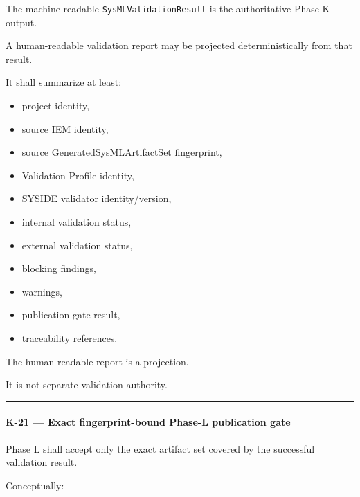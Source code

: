 The machine-readable \texttt{SysMLValidationResult} is the authoritative Phase-K output.

A human-readable validation report may be projected deterministically from that result.

It shall summarize at least:

\begin{itemize}
\tightlist
\item
  project identity,
\item
  source IEM identity,
\item
  source GeneratedSysMLArtifactSet fingerprint,
\item
  Validation Profile identity,
\item
  SYSIDE validator identity/version,
\item
  internal validation status,
\item
  external validation status,
\item
  blocking findings,
\item
  warnings,
\item
  publication-gate result,
\item
  traceability references.
\end{itemize}

The human-readable report is a projection.

It is not separate validation authority.

\begin{center}\rule{0.5\linewidth}{0.5pt}\end{center}

\hypertarget{k-21--exact-fingerprint-bound-phase-l-publication-gate}{%
\paragraph{K-21 --- Exact fingerprint-bound Phase-L publication gate}\label{k-21--exact-fingerprint-bound-phase-l-publication-gate}}

Phase L shall accept only the exact artifact set covered by the successful validation result.

Conceptually:

\begin{Shaded}
\begin{Highlighting}[]
\NormalTok{)}
\end{Highlighting}
\end{Shaded}


